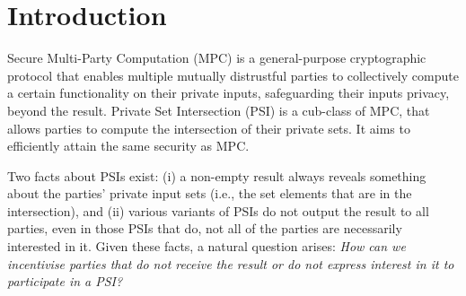 



\vspace{-4.5mm}


\section{Introduction}

\vspace{-1mm}

Secure Multi-Party Computation (MPC) is a general-purpose cryptographic protocol that enables multiple mutually distrustful parties to collectively compute a certain functionality on their private inputs, safeguarding their inputs privacy, beyond the result. Private Set Intersection (PSI) is a cub-class of MPC, that allows parties to compute the intersection of their private sets. It aims to efficiently attain the same security as MPC.


%



Two facts about PSIs exist: (i) a non-empty result always reveals something about the parties' private input sets (i.e., the set elements that are in the intersection), and (ii) various variants of PSIs do not output the result to all parties, even in those PSIs that do,  not all of the parties are necessarily interested in it.  Given these facts, a natural question arises:   
%
\emph{How can we incentivise parties that do not receive the result or do not express interest in it to participate in a PSI?}


